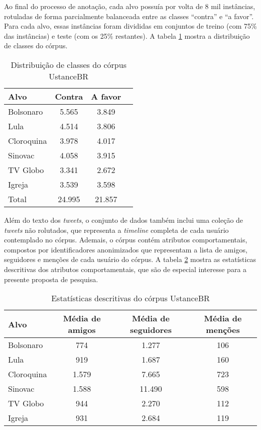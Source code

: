 \documentclass[
	12pt, oneside, a4paper, english, brazil
]{abntex2ppgsi}
\begin{document}
Ao final do processo de anotação, cada alvo possuía por volta de 8 mil instâncias, rotuladas de forma parcialmente balanceada entre as classes ``contra'' e ``a favor''. Para cada alvo, essas instâncias foram divididas em conjuntos de treino (com 75\% das instâncias) e teste (com os 25\% restantes). A tabela \ref{tab:distribuicao-ustancebr} mostra a distribuição de classes do córpus.

\begin{table}[ht]
\caption{Distribuição de classes do córpus UstanceBR}
\centering
\begin{tabular}{ l   c c c}
\hline
Alvo	     & Contra & A favor\\
\hline
Bolsonaro    & 5.565   & 3.849 \\
Lula 	     & 4.514   & 3.806 \\
Cloroquina 	 & 3.978   & 4.017 \\
Sinovac 	 & 4.058   & 3.915 \\
TV Globo 	 & 3.341   & 2.672 \\
Igreja 	     & 3.539   & 3.598 \\
\hline
Total 	 & 24.995  & 21.857 \\
\hline
\end{tabular}
\label{tab:distribuicao-ustancebr}
\end{table}

Além do texto dos {\em tweets}, o conjunto de dados também inclui uma coleção de {\em tweets} não rolutados, que representa a {\em timeline} completa de cada usuário contemplado no córpus. Ademais, o córpus contém atributos comportamentais, compostos por identificadores anonimizados que representam a lista de amigos, seguidores e menções de cada usuário do córpus. A tabela \ref{tab:estatisticas-ustancebr} mostra as estatísticas descritivas dos atributos comportamentais, que são de especial interesse para a presente proposta de pesquisa.

\begin{table}
\caption{Estatísticas descritivas do córpus UstanceBR}
\centering
\begin{tabular}{ l c c c }
\hline
Alvo	    & Média de amigos & Média de seguidores & Média de menções \\
\hline
Bolsonaro 	&  774           & 1.277          & 106 \\
Lula 	    &  919           & 1.687          & 160\\
Cloroquina 	&  1.579          & 7.665          & 723\\
Sinovac 	&  1.588          & 11.490         & 598\\
TV Globo 	&  944           & 2.270          & 112\\
Igreja 	    &  931           & 2.684          & 119\\
\hline
\end{tabular}
\label{tab:estatisticas-ustancebr}
\end{table}
\end{document}
